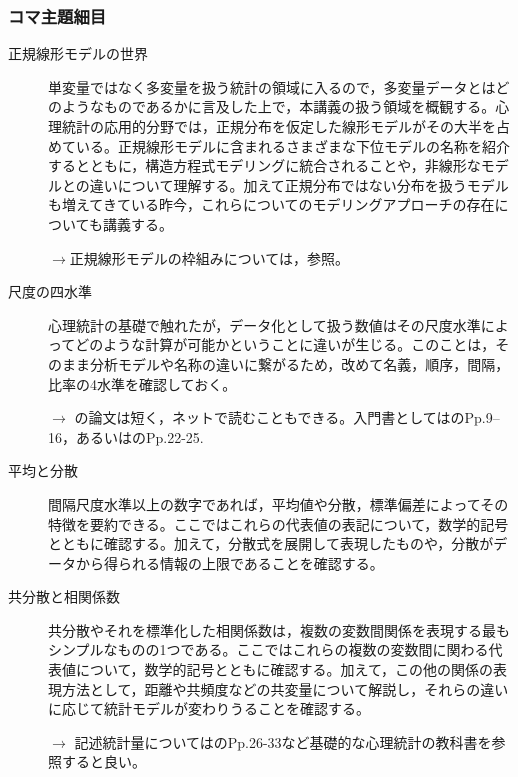 \subsubsection{コマ主題細目}
\begin{description}
	\item[正規線形モデルの世界]単変量ではなく多変量を扱う統計の領域に入るので，多変量データとはどのようなものであるかに言及した上で，本講義の扱う領域を概観する。心理統計の応用的分野では，正規分布を仮定した線形モデルがその大半を占めている。正規線形モデルに含まれるさまざまな下位モデルの名称を紹介するとともに，構造方程式モデリングに統合されることや，非線形なモデルとの違いについて理解する。加えて正規分布ではない分布を扱うモデルも増えてきている昨今，これらについてのモデリングアプローチの存在についても講義する。
	      \begin{flushright}
		      $\to$正規線形モデルの枠組みについては，\textcite{Minaka2018}参照。
	      \end{flushright}

	\item[尺度の四水準]心理統計の基礎で触れたが，データ化として扱う数値はその尺度水準によってどのような計算が可能かということに違いが生じる。このことは，そのまま分析モデルや名称の違いに繋がるため，改めて名義，順序，間隔，比率の4水準を確認しておく。
	      \begin{flushright}
		      $\to$ \textcite{stevens1946}の論文は短く，ネットで読むこともできる。入門書としては\textcite{Kawabata201408}のPp.9--16，あるいは\textcite{Yamada2004}のPp.22-25.
	      \end{flushright}

	\item[平均と分散]間隔尺度水準以上の数字であれば，平均値や分散，標準偏差によってその特徴を要約できる。ここではこれらの代表値の表記について，数学的記号とともに確認する。加えて，分散式を展開して表現したものや，分散がデータから得られる情報の上限であることを確認する。

	\item[共分散と相関係数]共分散やそれを標準化した相関係数は，複数の変数間関係を表現する最もシンプルなものの1つである。ここではこれらの複数の変数間に関わる代表値について，数学的記号とともに確認する。加えて，この他の関係の表現方法として，距離や共頻度などの共変量について解説し，それらの違いに応じて統計モデルが変わりうることを確認する。

	      \begin{flushright}
		      $\to$ 記述統計量については\textcite{Kawabata201408}のPp.26-33など基礎的な心理統計の教科書を参照すると良い。
	      \end{flushright}


\end{description}
